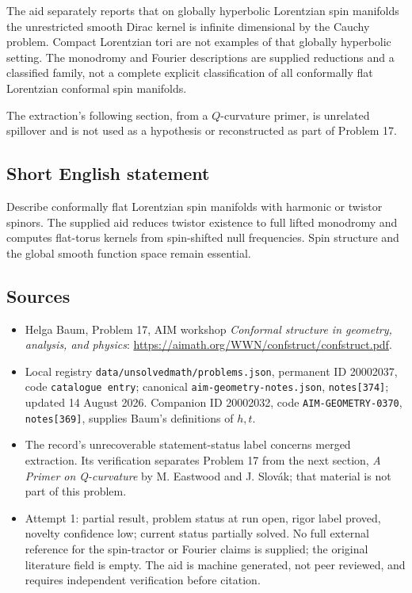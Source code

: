 \documentclass[11pt]{article}
\begin{document}
The aid separately reports that on globally hyperbolic Lorentzian spin manifolds the unrestricted smooth Dirac kernel is infinite dimensional by the Cauchy problem. Compact Lorentzian tori are not examples of that globally hyperbolic setting. The monodromy and Fourier descriptions are supplied reductions and a classified family, not a complete explicit classification of all conformally flat Lorentzian conformal spin manifolds.

The extraction's following section, from a \(Q\)-curvature primer, is unrelated spillover and is not used as a hypothesis or reconstructed as part of Problem 17.
\subsection{Short English statement}
Describe conformally flat Lorentzian spin manifolds with harmonic or twistor spinors. The supplied aid reduces twistor existence to full lifted monodromy and computes flat-torus kernels from spin-shifted null frequencies. Spin structure and the global smooth function space remain essential.
\subsection{Sources}
\begin{itemize}
\item Helga Baum, Problem 17, AIM workshop \emph{Conformal structure in geometry, analysis, and physics}: \url{https://aimath.org/WWN/confstruct/confstruct.pdf}.
\item Local registry \texttt{data/unsolvedmath/problems.json}, permanent ID 20002037, code \texttt{catalogue entry}; canonical \texttt{aim-geometry-notes.json}, \texttt{notes[374]}; updated 14 August 2026. Companion ID 20002032, code \texttt{AIM-GEOMETRY-0370}, \texttt{notes[369]}, supplies Baum's definitions of \(h,t\).
\item The record's unrecoverable statement-status label concerns merged extraction. Its verification separates Problem 17 from the next section, \emph{A Primer on Q-curvature} by M. Eastwood and J. Slov\'ak; that material is not part of this problem.
\item Attempt 1: partial result, problem status at run open, rigor label proved, novelty confidence low; current status partially solved. No full external reference for the spin-tractor or Fourier claims is supplied; the original literature field is empty. The aid is machine generated, not peer reviewed, and requires independent verification before citation.
\end{itemize}
\end{document}

